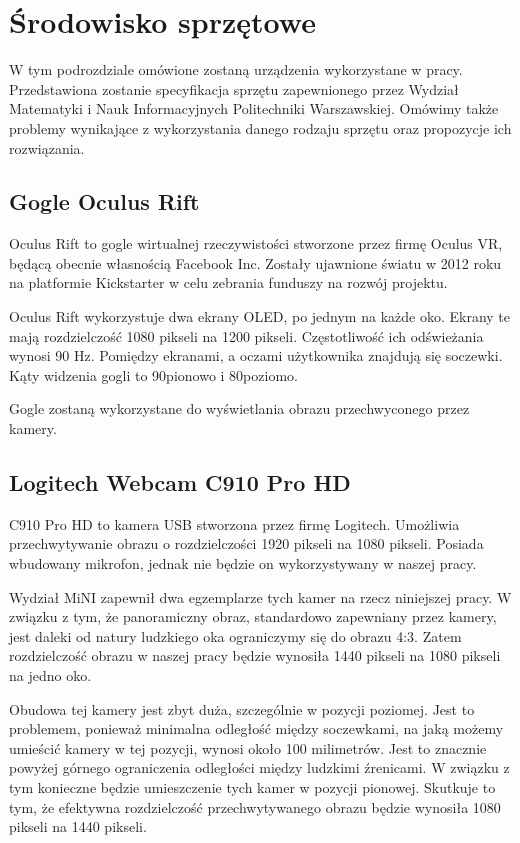 \documentclass[a4paper,11pt,twoside]{report}
\theoremstyle{definition}
\begin{document}
\section{Środowisko sprzętowe}
W tym podrozdziale omówione zostaną urządzenia wykorzystane w pracy. Przedstawiona zostanie specyfikacja sprzętu zapewnionego przez Wydział Matematyki i Nauk Informacyjnych Politechniki Warszawskiej. Omówimy także problemy wynikające z wykorzystania danego rodzaju sprzętu oraz propozycje ich rozwiązania.

\subsection{Gogle Oculus Rift}
Oculus Rift to gogle wirtualnej rzeczywistości stworzone przez firmę Oculus VR, będącą obecnie własnością Facebook Inc. Zostały ujawnione światu w 2012 roku na platformie Kickstarter w celu zebrania funduszy na rozwój projektu. 

Oculus Rift wykorzystuje dwa ekrany OLED, po jednym na każde oko. Ekrany te mają rozdzielczość 1080 pikseli na 1200 pikseli. Częstotliwość ich odświeżania wynosi 90 Hz. Pomiędzy ekranami, a oczami użytkownika znajdują się soczewki. Kąty widzenia gogli to 90\textdegree  pionowo i 80\textdegree  poziomo.

Gogle zostaną wykorzystane do wyświetlania obrazu przechwyconego przez kamery.

\subsection{Logitech Webcam C910 Pro HD}
C910 Pro HD to kamera USB stworzona przez firmę Logitech. Umożliwia przechwytywanie obrazu o rozdzielczości 1920 pikseli na 1080 pikseli. Posiada wbudowany mikrofon, jednak nie będzie on wykorzystywany w naszej pracy.

Wydział MiNI zapewnił dwa egzemplarze tych kamer na rzecz niniejszej pracy. W związku z tym, że panoramiczny obraz, standardowo zapewniany przez kamery, jest daleki od natury ludzkiego oka ograniczymy się do obrazu 4:3. Zatem rozdzielczość obrazu w naszej pracy będzie wynosiła 1440 pikseli na 1080 pikseli na jedno oko.

Obudowa tej kamery jest zbyt duża, szczególnie w pozycji poziomej. Jest to problemem, ponieważ minimalna odległość między soczewkami, na jaką możemy umieścić kamery w tej pozycji, wynosi około 100 milimetrów. Jest to znacznie powyżej górnego ograniczenia odległości między ludzkimi źrenicami. W związku z tym konieczne będzie umieszczenie tych kamer w pozycji pionowej. Skutkuje to tym, że efektywna rozdzielczość przechwytywanego obrazu będzie wynosiła 1080 pikseli na 1440 pikseli.
\end{document}
